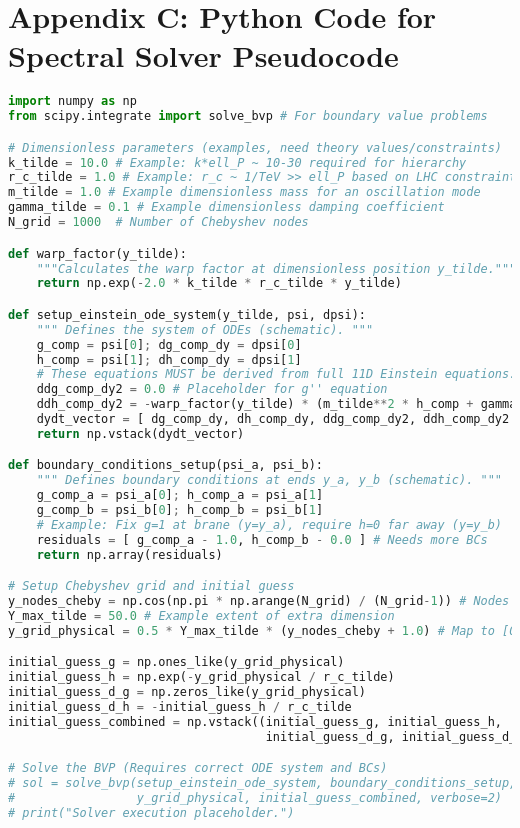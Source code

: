 \documentclass[12pt, a4paper]{article} %
\begin{document}
\section{Appendix C: Python Code for Spectral Solver Pseudocode}
\label{app:python_code_app_final_full_revised_again_final_ultra}
\begin{lstlisting}[language=Python, caption=Spectral solver pseudocode for dimensionless Einstein Equations]
import numpy as np
from scipy.integrate import solve_bvp # For boundary value problems

# Dimensionless parameters (examples, need theory values/constraints)
k_tilde = 10.0 # Example: k*ell_P ~ 10-30 required for hierarchy
r_c_tilde = 1.0 # Example: r_c ~ 1/TeV >> ell_P based on LHC constraints
m_tilde = 1.0 # Example dimensionless mass for an oscillation mode
gamma_tilde = 0.1 # Example dimensionless damping coefficient
N_grid = 1000  # Number of Chebyshev nodes

def warp_factor(y_tilde):
    """Calculates the warp factor at dimensionless position y_tilde."""
    return np.exp(-2.0 * k_tilde * r_c_tilde * y_tilde)

def setup_einstein_ode_system(y_tilde, psi, dpsi):
    """ Defines the system of ODEs (schematic). """
    g_comp = psi[0]; dg_comp_dy = dpsi[0]
    h_comp = psi[1]; dh_comp_dy = dpsi[1]
    # These equations MUST be derived from full 11D Einstein equations.
    ddg_comp_dy2 = 0.0 # Placeholder for g'' equation
    ddh_comp_dy2 = -warp_factor(y_tilde) * (m_tilde**2 * h_comp + gamma_tilde * dh_comp_dy) # Example
    dydt_vector = [ dg_comp_dy, dh_comp_dy, ddg_comp_dy2, ddh_comp_dy2 ]
    return np.vstack(dydt_vector)

def boundary_conditions_setup(psi_a, psi_b):
    """ Defines boundary conditions at ends y_a, y_b (schematic). """
    g_comp_a = psi_a[0]; h_comp_a = psi_a[1]
    g_comp_b = psi_b[0]; h_comp_b = psi_b[1]
    # Example: Fix g=1 at brane (y=y_a), require h=0 far away (y=y_b)
    residuals = [ g_comp_a - 1.0, h_comp_b - 0.0 ] # Needs more BCs
    return np.array(residuals)

# Setup Chebyshev grid and initial guess
y_nodes_cheby = np.cos(np.pi * np.arange(N_grid) / (N_grid-1)) # Nodes in [-1, 1]
Y_max_tilde = 50.0 # Example extent of extra dimension
y_grid_physical = 0.5 * Y_max_tilde * (y_nodes_cheby + 1.0) # Map to [0, Y_max_tilde]

initial_guess_g = np.ones_like(y_grid_physical)
initial_guess_h = np.exp(-y_grid_physical / r_c_tilde)
initial_guess_d_g = np.zeros_like(y_grid_physical)
initial_guess_d_h = -initial_guess_h / r_c_tilde
initial_guess_combined = np.vstack((initial_guess_g, initial_guess_h,
                                    initial_guess_d_g, initial_guess_d_h))

# Solve the BVP (Requires correct ODE system and BCs)
# sol = solve_bvp(setup_einstein_ode_system, boundary_conditions_setup,
#                 y_grid_physical, initial_guess_combined, verbose=2)
# print("Solver execution placeholder.")
\end{lstlisting}
\end{document}

